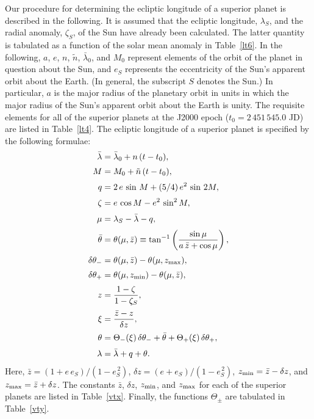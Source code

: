 Our procedure for determining the ecliptic longitude of a superior planet is described in the following. It is assumed that the ecliptic longitude, $\lambda_S$, and the
radial anomaly, $\zeta_S$, of the Sun have already been calculated. The latter quantity is tabulated as a function of the solar mean anomaly
in Table~\ref{lt6}. In the following, $a$, $e$, $n$, $\tilde{n}$, $\bar{\lambda}_0$, and $M_0$ represent  elements of the orbit of the planet in question
about the Sun, and $e_S$  represents the eccentricity of the Sun's apparent orbit
about the Earth. (In general, the subscript $S$ denotes the Sun.) In particular, $a$ is the major radius of the planetary orbit in
units in which the major radius of the Sun's apparent orbit about the
Earth is unity. The requisite elements for all of the superior planets at the J2000 epoch ($t_0=2\,451\,545.0$ JD)
are listed in Table~\ref{lt4}. The ecliptic longitude of a superior
planet is specified by the following formulae:
\begin{align}
\bar{\lambda}&=  \bar{\lambda}_0 + n\,(t-t_0) ,\\[0.5ex]
M &= M_0  +\tilde{n}\,(t-t_0),\\[0.5ex]
q&= 2\,e\,\sin \,M + (5/4)\,e^2\,\sin\,2M,\label{ve3.8}\\[0.5ex]
\zeta &= e\,\cos M - e^2\,\sin^2 M,\\[0.5ex]
\mu&= \lambda_S - \bar{\lambda}-q,\\[0.5ex]
\bar{\theta} &= \theta(\mu,\bar{z})\equiv \tan^{-1} \left(\frac{\sin\mu}{a\,\bar{z}+\cos\mu}\right),\\[0.5ex]
\delta\theta_- &= \theta(\mu,\bar{z}) - \theta(\mu,z_{\rm max}),\\[0.5ex]
\delta\theta_+&= \theta(\mu,z_{\rm min}) - \theta(\mu,\bar{z}),\\[0.5ex]
z &= \frac{1-\zeta}{1-\zeta_S},\\[0.5ex]
\xi &= \frac{\bar{z}-z}{\delta z},\\[0.5ex]
\theta  &=\Theta_-(\xi)\,\delta\theta_-+ \bar{\theta}
+ \Theta_+(\xi)\,\delta\theta_+,\\[0.5ex]
\lambda &=\bar{\lambda} + q+ \theta.
\end{align}
Here, $\bar{z} = (1+e\,e_S)/(1-e_S^{\,2})$, $\delta z = (e+e_S)/(1-e_S^{\,2})$, $z_{\rm min} = \bar{z}-\delta z$,
and $z_{\rm max} = \bar{z}+\delta z$.  The constants $\bar{z}$, $\delta z$, $z_{\rm min}$, and $z_{\rm max}$ 
for each of the superior planets are listed in Table~\ref{vtx}.  Finally, the functions $\Theta_\pm$ are  tabulated in Table~\ref{vty}.

